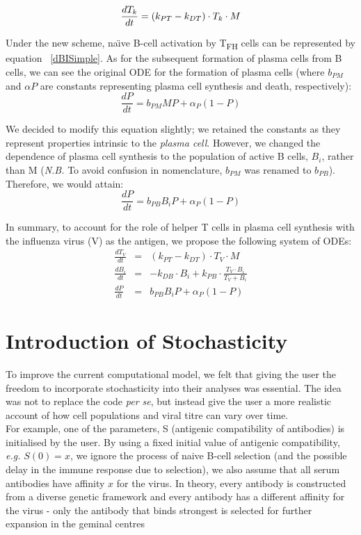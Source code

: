 \documentclass[a4paper, 12pt]{report}
\begin{document}
\begin{equation}
\frac{dT_k}{dt} = (k_{PT}-k_{DT}) \cdot T_k \cdot M \\
\end{equation}

Under the new scheme, na\"\i ve B-cell activation by T\textsubscript{FH} cells can be represented by equation ~\ref{dBISimple}. As for the subsequent formation of plasma cells from B cells, we can see the original ODE for the formation of plasma cells (where $b_{PM}$ and $\alpha{P}$ are constants representing plasma cell synthesis and death, respectively):
\begin{equation}
\frac{dP}{dt} = b_{PM}MP + \alpha_{P}(1 - P)
\end{equation}

We decided to modify this equation slightly; we retained the constants as they represent properties intrinsic to the \emph{plasma cell}. However, we changed the dependence of plasma cell synthesis to the population of active B cells, $B_{i}$, rather than M (\emph{N.B. }To avoid confusion in nomenclature, $b_{PM}$ was renamed to $b_{PB}$). Therefore, we would attain:
\begin{equation}
\frac{dP}{dt} = b_{PB}B_{i}P + \alpha_{P}(1 - P)
\end{equation}

In summary, to account for the role of helper T cells in plasma cell synthesis with the influenza virus (V) as the antigen, we propose the following system of ODEs:
\begin{eqnarray*}
\frac{dT_V}{dt} &=& (k_{PT}-k_{DT}) \cdot T_V \cdot M \\
\frac{dB_i}{dt} &=& -k_{DB} \cdot B_i + k_{PB} \cdot \frac{T_{V} \cdot B_{i}}{T_{V}+B_{i}} \\
\frac{dP}{dt} &=& b_{PB}B_{i}P + \alpha_{P}(1 - P)
\end{eqnarray*}

\section{Introduction of Stochasticity} %
To improve the current computational model, we felt that giving the user the freedom to incorporate stochasticity into their analyses was essential. The idea was not to replace the code \emph{per se}, but instead give the user a more realistic account of how cell populations and viral titre can vary over time.\\

For example, one of the parameters, S (antigenic compatibility of antibodies) is initialised by the user. By using a fixed initial value of antigenic compatibility, \emph{e.g.} $S(0) = x$, we ignore the process of naive B-cell selection (and the possible delay in the immune response due to selection), we also assume that all serum antibodies have affinity $x$ for the virus. In theory, every antibody is constructed from a diverse genetic framework and every antibody has a different affinity for the virus - only the antibody that binds strongest is selected for further expansion in the geminal centres %
\end{document}

